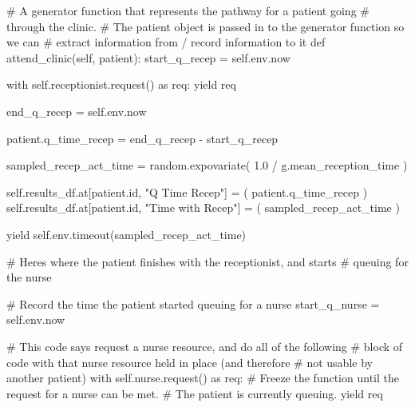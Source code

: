 \documentclass[
  letterpaper,
  DIV=11,
  numbers=noendperiod]{scrreprt}
\newenvironment{Shaded}{}{}
\newcommand{\BuiltInTok}[1]{\textcolor[rgb]{0.84,0.23,0.29}{#1}}
\newcommand{\CommentTok}[1]{\textcolor[rgb]{0.42,0.45,0.49}{#1}}
\newcommand{\ControlFlowTok}[1]{\textcolor[rgb]{0.84,0.23,0.29}{#1}}
\newcommand{\FloatTok}[1]{\textcolor[rgb]{0.00,0.36,0.77}{#1}}
\newcommand{\ImportTok}[1]{\textcolor[rgb]{0.01,0.18,0.38}{#1}}
\newcommand{\KeywordTok}[1]{\textcolor[rgb]{0.84,0.23,0.29}{#1}}
\newcommand{\NormalTok}[1]{\textcolor[rgb]{0.14,0.16,0.18}{#1}}
\newcommand{\OperatorTok}[1]{\textcolor[rgb]{0.14,0.16,0.18}{#1}}
\newcommand{\StringTok}[1]{\textcolor[rgb]{0.01,0.18,0.38}{#1}}
\newcommand{\VariableTok}[1]{\textcolor[rgb]{0.89,0.38,0.04}{#1}}
\begin{document}
\begin{tcolorbox}
\begin{Shaded}
\begin{Highlighting}[]
    \CommentTok{\# A generator function that represents the pathway for a patient going}
    \CommentTok{\# through the clinic.}
    \CommentTok{\# The patient object is passed in to the generator function so we can}
    \CommentTok{\# extract information from / record information to it}
    \KeywordTok{def}\NormalTok{ attend\_clinic(}\VariableTok{self}\NormalTok{, patient):}
\NormalTok{        start\_q\_recep }\OperatorTok{=} \VariableTok{self}\NormalTok{.env.now}

        \ControlFlowTok{with} \VariableTok{self}\NormalTok{.receptionist.request() }\ImportTok{as}\NormalTok{ req:}
            \ControlFlowTok{yield}\NormalTok{ req}

\NormalTok{            end\_q\_recep }\OperatorTok{=} \VariableTok{self}\NormalTok{.env.now}

\NormalTok{            patient.q\_time\_recep }\OperatorTok{=}\NormalTok{ end\_q\_recep }\OperatorTok{{-}}\NormalTok{ start\_q\_recep}

\NormalTok{            sampled\_recep\_act\_time }\OperatorTok{=}\NormalTok{ random.expovariate(}
                \FloatTok{1.0} \OperatorTok{/}\NormalTok{ g.mean\_reception\_time}
\NormalTok{            )}

            \VariableTok{self}\NormalTok{.results\_df.at[patient.}\BuiltInTok{id}\NormalTok{, }\StringTok{"Q Time Recep"}\NormalTok{] }\OperatorTok{=}\NormalTok{ (}
\NormalTok{                 patient.q\_time\_recep}
\NormalTok{            )}
            \VariableTok{self}\NormalTok{.results\_df.at[patient.}\BuiltInTok{id}\NormalTok{, }\StringTok{"Time with Recep"}\NormalTok{] }\OperatorTok{=}\NormalTok{ (}
\NormalTok{                 sampled\_recep\_act\_time}
\NormalTok{            )}

            \ControlFlowTok{yield} \VariableTok{self}\NormalTok{.env.timeout(sampled\_recep\_act\_time)}

        \CommentTok{\# Here\textquotesingle{}s where the patient finishes with the receptionist, and starts}
        \CommentTok{\# queuing for the nurse}

        \CommentTok{\# Record the time the patient started queuing for a nurse}
\NormalTok{        start\_q\_nurse }\OperatorTok{=} \VariableTok{self}\NormalTok{.env.now}

        \CommentTok{\# This code says request a nurse resource, and do all of the following}
        \CommentTok{\# block of code with that nurse resource held in place (and therefore}
        \CommentTok{\# not usable by another patient)}
        \ControlFlowTok{with} \VariableTok{self}\NormalTok{.nurse.request() }\ImportTok{as}\NormalTok{ req:}
            \CommentTok{\# Freeze the function until the request for a nurse can be met.}
            \CommentTok{\# The patient is currently queuing.}
            \ControlFlowTok{yield}\NormalTok{ req}


\end{Highlighting}
\end{Shaded}
\end{tcolorbox}
\end{document}
